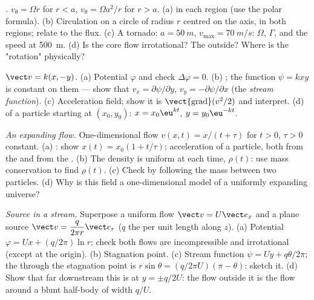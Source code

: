 \begin{exercise}[$\star\star$]\label{exo:b2:fluid-kinematics:8}
\emph{.} $v_\theta = \Omega r$ for $r < a$, $v_\theta = \Omega a^2/r$
for $r > a$. (a)  in each region (use the polar formula). (b)
Circulation on a circle of radius $r$ centred on the axis, in both
regions; relate to the  flux. (c) A tornado: $a = \qty{50}{m}$,
$v_{\max} = \qty{70}{m/s}$: $\Omega$, $\Gamma$, and the speed at \qty{500}{m}.
(d) Is the core flow irrotational? The outside? Where is the
"rotation" physically?
\end{exercise}

\begin{exercise}[$\star\star$]\label{exo:b2:fluid-kinematics:9}
\emph{} $\vect v = k(x, -y)$. (a) Potential $\varphi$ and
check $\Delta\varphi = 0$. (b) ; the function $\psi = kxy$ is
constant on them --- show that $v_x = \partial\psi/\partial y$, $v_y = -\partial\psi/
\partial x$ (the \emph{stream function}). (c) Acceleration field; show it
is $\operatorname{\vect{grad}}(v^2/2)$ and interpret. (d)  of a
particle starting at $(x_0, y_0)$: $x = x_0\eu^{kt}$, $y = y_0\eu^{-kt}$.
\end{exercise}

\begin{exercise}[$\star\star\star$]\label{exo:b2:fluid-kinematics:10}
\emph{An expanding flow.} One-dimensional flow $v(x, t) = x/(t + \tau)$
for $t > 0$, $\tau > 0$ constant. (a) : show $x(t) = x_0(1 +
t/\tau)$; acceleration of a particle, both from the  and from
the . (b) The density is uniform at each time,
$\rho(t)$: use mass conservation to find $\rho(t)$. (c) Check by
following the mass between two particles. (d) Why is this field a
one-dimensional model of a uniformly expanding universe?
\end{exercise}

\begin{exercise}[$\star\star\star$]\label{exo:b2:fluid-kinematics:11}
\emph{Source in a stream.} Superpose a uniform flow $\vect v = U\vect e_x$
and a plane source $\vect v = \dfrac{q}{2\pi r}\vect e_r$ ($q$ the  per unit length along $z$). (a) Potential $\varphi = Ux +
(q/2\pi)\ln r$; check both flows are incompressible and irrotational
(except at the origin). (b) Stagnation point. (c) Stream function $\psi
= Uy + q\theta/2\pi$; the  through the stagnation point is
$r\sin\theta = (q/2\pi U)(\pi - \theta)$: sketch it. (d) Show that far
downstream this  is at $y = \pm q/2U$: the flow outside it is
the flow around a blunt half-body of width $q/U$.
\end{exercise}

